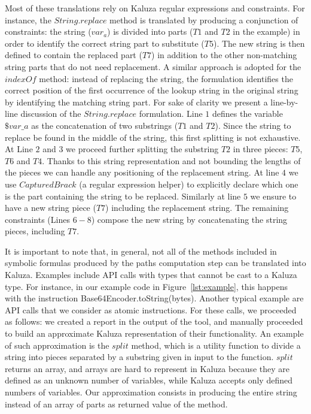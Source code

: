   Most of these translations rely on Kaluza regular expressions and constraints. For instance, the $String.replace$  method is translated by producing a conjunction of constraints:
  the string ($var_a$) is divided into parts ($T1$ and $T2$ in the example) in order to identify the correct
  string part to substitute ($T5$). The new string is then defined to contain the replaced part
  ($T7$) in addition to the other non-matching string parts that do not need replacement.
  A similar approach is adopted for the $indexOf$ method: instead of replacing the string, the formulation identifies the correct position of the first occurrence of the lookup string in the original string by identifying the matching string part.
  For sake of clarity we present a line-by-line discussion of the $String.replace$ formulation.
  Line $1$ defines the variable $\$var\_a$ as the concatenation of two substrings ($T1$ and $T2$).
  Since the string to replace be found in the middle of the string, this first
  splitting is not exhaustive. At Line $2$ and $3$ we proceed further splitting the substring $T2$ in three
  pieces: $T5$, $T6$ and $T4$. Thanks to this string representation and not bounding the lengths of the pieces
  we can handle any positioning of the replacement string.
  At line $4$ we use $CapturedBrack$ (a regular expression helper) to explicitly declare which one is the part
  containing the string to be replaced. Similarly at line $5$ we ensure to have a new string piece ($T7$)
  including the replacement string.
  The remaining constraints (Lines $6-8$) compose the new string by concatenating the string pieces,
  including $T7$.



  It is important to note that, in general, not all of the methods included in symbolic formulas produced by the paths computation step can be translated into Kaluza. Examples include API calls with types that cannot be cast to a Kaluza type. For instance, in our example code in Figure~\ref{lst:example}, this happens with the instruction Base64Encoder.toString(bytes). Another typical example are API calls that we consider as atomic instructions. For these calls, we proceeded as follows: we created a report in the output of the tool, and manually proceeded to build an approximate Kaluza representation of their functionality. An example of such approximation is the $split$ method, which is a utility function to divide a string into pieces separated by a substring given in input to the function. $split$ returns an array, and arrays are hard to represent in Kaluza because
  they are defined as an unknown number of variables, while Kaluza accepts only defined numbers of variables. Our approximation consists in producing the entire string instead of an
  array of parts as returned value of the method.

